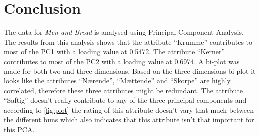 \section*{Conclusion}
%
The data for \textit{Men and Bread} is analysed using Principal Component Analysis. The results from this analysis shows that the attribute ``Krumme'' contributes to most of the PC1 with a loading value at 0.5472. The attribute ``Kerner'' contributes to most of the PC2 with a loading value at 0.6974. \blankline
%
A bi-plot was made for both two and three dimensions. Based on the three dimensions bi-plot it looks like the attributes ``Nærende'', ``Mættende'' and ``Skorpe'' are highly correlated, therefore these three attributes might be redundant. \noindent 
%
The attribute ``Saftig'' doesn't really contribute to any of the three principal components and according to \autoref{fig:plot} the rating of this attribute doesn't vary that much between the different buns which also indicates that this attribute isn't that important for this PCA.